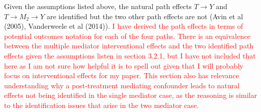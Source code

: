 \documentclass[12pt]{article} %
\numberwithin{equation}{section} %
\begin{document}
Given the assumptions listed above, the natural path effects $T \rightarrow Y$ and $T \rightarrow M_{2} \rightarrow Y$ are identified but the two other path effects are not (Avin et al (2005), Vanderweele et al (2014)). \textcolor{red}{I have derived the path effects in terms of potential outcomes notation for each of the four paths. There is an equivalence between the multiple mediator interventional effects and the two identified path effects given the assumptions listen in section 3.2.1, but I have not included that here as I am not sure how helpful it is to spell out given that I will probably focus on interventional effects for my paper. This section also has relevance understanding why a post-treatment mediating confounder leads to natural effects not being identified in the single mediator case, as the reasoning is similar to the identification issues that arise in the two mediator case.}




\end{document}
